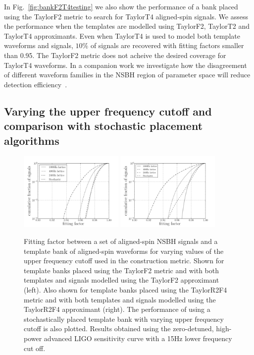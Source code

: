 In Fig.~\ref{fig:bankF2T4testing} we also show the performance of a bank
placed using the TaylorF2 metric to search for TaylorT4 aligned-spin signals.
We assess the performance when the templates are modelled using TaylorF2,
TaylorT2 and TaylorT4 approximants. Even when TaylorT4 is used to model both
template waveforms and signals, $10\%$ of signals are recovered with fitting
factors smaller than 0.95. The TaylorF2 metric does not acheive the desired
coverage for TaylorT4 waveforms. In a companion work we investigate how the 
disagreement of different waveform families in the \ac{NSBH} region of 
parameter space will reduce detection efficiency~\cite{Nitz:2013mxa}.

\subsection{Varying the upper frequency cutoff and comparison with stochastic
placement algorithms}
\label{ssec:stoch_fup_compare}

\begin{figure}
    \centering
    \begin{minipage}[l]{\columnwidth}
    \centering
\includegraphics[width=0.45\textwidth]
{papers/nsbh_effectualness/figure6A.pdf}
\includegraphics[width=0.45\textwidth]
{papers/nsbh_effectualness/figure6B.pdf}
\caption{\label{fig:bankfcutoff}
Fitting factor between a set of aligned-spin \ac{NSBH} signals
and a template bank of aligned-spin waveforms for varying values of the upper
frequency cutoff used in the construction metric. Shown for template banks
placed using the TaylorF2 metric and with both templates and signals 
modelled using the TaylorF2 approximant (left). Also shown for template banks
placed using the TaylorR2F4 metric and with both templates and signals 
modelled using the TaylorR2F4 approximant (right). The
performance of using a stochastically placed template bank with varying upper
frequency cutoff is also plotted. Results obtained
using the zero-detuned, high-power advanced LIGO sensitivity curve with a 15Hz
lower frequency cut off.
}
\end{minipage}
\end{figure}

